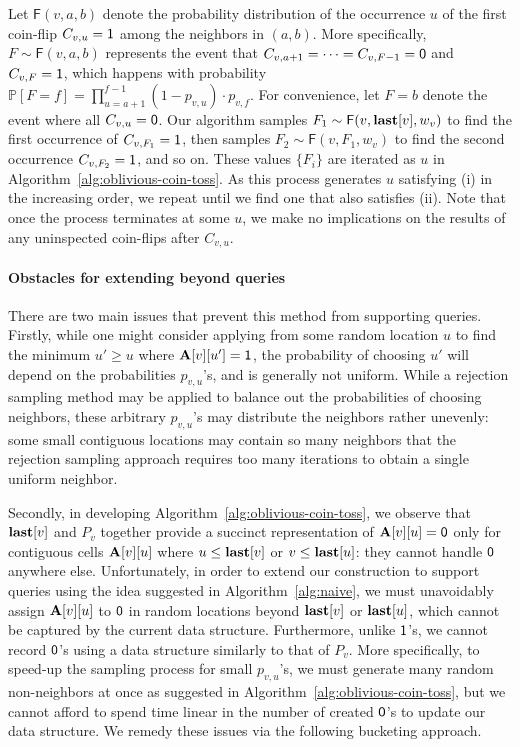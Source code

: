 Let $\mathsf{F}(v,a,b)$ denote the probability distribution of the occurrence $u$ of the first coin-flip $C_{v,u} = \mathsf{1}$ among the neighbors in $(a, b)$.
More specifically, $F\sim\mathsf{F}(v,a,b)$ represents the event that $C_{v,a+1}=\cdots=C_{v,F-1}=\mathsf{0}$ and $C_{v,F}=\mathsf{1}$,
which happens with probability $\mathbb P[F=f]=\prod_{u=a+1}^{f-1} (1-p_{v,u}) \cdot p_{v,f}$.
For convenience, let $F = b$ denote the event where all $C_{v,u}=\mathsf{0}$. Our algorithm samples $F_1\sim\mathsf{F}(v,\mathbf{last}[v],w_v)$ to find the first occurrence of $C_{v,F_1} = \mathsf{1}$, then samples $F_2\sim\mathsf{F}(v,F_1,w_v)$ to find the second occurrence $C_{v,F_2} = \mathsf{1}$, and so on.
These values $\{F_i\}$ are iterated as $u$ in Algorithm~\ref{alg:oblivious-coin-toss}.
As this process generates $u$ satisfying (i) in the increasing order, we repeat until we find one that also satisfies (ii).
Note that once the process terminates at some $u$, we make no implications on the results of any uninspected coin-flips after $C_{v,u}$.

\paragraph*{Obstacles for extending beyond  queries}
There are two main issues that prevent this method from supporting  queries. Firstly, while one might consider applying  from some random location $u$ to find the minimum $u' \geq u$ where $\mathbf{A}[v][u']=\mathsf{1}$, the probability of choosing $u'$ will depend on the probabilities $p_{v,u}$'s, and is generally not uniform. While a rejection sampling method may be applied to balance out the probabilities of choosing neighbors, these arbitrary $p_{v,u}$'s may distribute the neighbors rather unevenly: some small contiguous locations may contain so many neighbors that the rejection sampling approach requires too many iterations to obtain a single uniform neighbor.

 Secondly, in developing Algorithm~\ref{alg:oblivious-coin-toss}, we observe that $\mathbf{last}[v]$ and $P_v$ together provide a succinct representation of $\mathbf{A}[v][u] = \mathsf{0}$ only for contiguous cells $\mathbf{A}[v][u]$ where $u \leq \mathbf{last}[v]$ or $v \leq \mathbf{last}[u]$: they cannot handle $\mathsf{0}$ anywhere else. Unfortunately, in order to extend our construction to support  queries using the idea suggested in Algorithm~\ref{alg:naive}, we must unavoidably assign $\mathbf{A}[v][u]$ to $\mathsf{0}$ in random locations beyond $\mathbf{last}[v]$ or $\mathbf{last}[u]$, which cannot be captured by the current data structure. Furthermore, unlike $\mathsf{1}$'s, we cannot record $\mathsf{0}$'s using a data structure similarly to that of $P_v$. More specifically, to speed-up the sampling process for small $p_{v,u}$'s, we must generate many random non-neighbors at once as suggested in Algorithm~\ref{alg:oblivious-coin-toss}, but we cannot afford to spend time linear in the number of created $\mathsf{0}$'s to update our data structure. We remedy these issues via the following bucketing approach.


